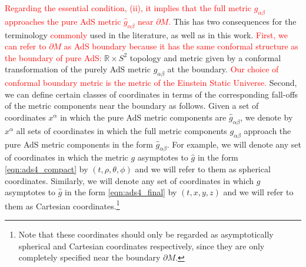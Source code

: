 \documentclass[a4paper,11pt]{article}
\numberwithin{equation}{section}
\begin{document}
\textcolor{red}{Regarding the essential condition, (ii), it implies that the full metric $g_{\alpha\beta}$ approaches the pure AdS metric $\hat{g}_{\alpha\beta}$ near $\partial M$.}
This has two consequences for the terminology \textcolor{red}{commonly}
used in the literature, as well as in this work.
\textcolor{red}{First, we can refer to $\partial M$ as AdS boundary because it has the same conformal structure as the boundary of pure AdS:}
$\mathbb{R}\times S^2$ topology and metric given by a conformal transformation of the purely AdS metric $\hat{g}_{\alpha\beta}$ at the boundary. 
\textcolor{red}{Our choice of conformal boundary metric is the metric of the Einstein Static Universe.}
Second, we can define certain classes of coordinates in terms of the corresponding fall-offs of the metric components near the boundary as follows.
Given a set of coordinates $x^\alpha$ in which the pure AdS metric components are $\hat{g}_{\alpha\beta}$, we denote by $x^\alpha$ all sets of coordinates in which the full metric components $g_{\alpha\beta}$ approach the pure AdS metric components in the form $\hat{g}_{\alpha\beta}$. For example, we will denote any set of coordinates in which the metric $g$ asymptotes to $\hat{g}$ in the form \eqref{eqn:ads4_compact} by $(t,\rho,\theta,\phi)$ and we will refer to them as spherical coordinates. Similarly, we will denote any set of coordinates in which $g$ asymptotes to $\hat{g}$ in the form \eqref{eqn:ads4_final} by $(t,x,y,z)$ and we will refer to them as Cartesian coordinates.\footnote{Note that these coordinates should only be regarded as asymptotically spherical and Cartesian coordinates respectively, since they are only completely specified near the boundary $\partial M$.}
\end{document}
